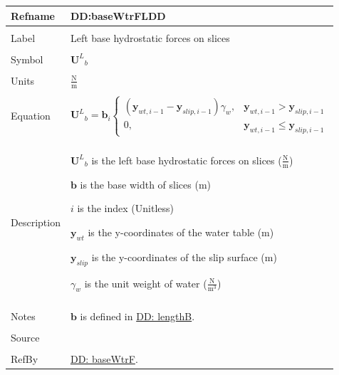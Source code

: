 \documentclass[12pt]{article}
\begin{document}
\noindent \begin{minipage}{\textwidth}
\begin{tabular}{p{} p{}}
\toprule \textbf{Refname} & \textbf{DD:baseWtrFLDD}
\label{DD:baseWtrFLDD}
\\ \midrule \\
Label & Left base hydrostatic forces on slices
\\ \midrule \\
Symbol & ${{\mathbf{U}^{L}}_{b}}$
\\ \midrule \\
Units & $\frac{\text{N}}{\text{m}}$
\\ \midrule \\
Equation & \begin{displaymath}
           {{\mathbf{U}^{L}}_{b}}={\mathbf{b}}_{i} \begin{cases}
\left({\mathbf{y}_{wt,i-1}}-{\mathbf{y}_{slip,i-1}}\right) {γ_{w}}, & {\mathbf{y}_{wt,i-1}}>{\mathbf{y}_{slip,i-1}}\\
0, & {\mathbf{y}_{wt,i-1}}\leq{}{\mathbf{y}_{slip,i-1}}
\end{cases}
           \end{displaymath}
\\ \midrule \\
Description & \begin{symbDescription}
              \item{${{\mathbf{U}^{L}}_{b}}$ is the left base hydrostatic forces on slices ($\frac{\text{N}}{\text{m}}$)}
              \item{$\mathbf{b}$ is the base width of slices (m)}
              \item{$i$ is the index (Unitless)}
              \item{${\mathbf{y}_{wt}}$ is the y-coordinates of the water table (m)}
              \item{${\mathbf{y}_{slip}}$ is the y-coordinates of the slip surface (m)}
              \item{${γ_{w}}$ is the unit weight of water ($\frac{\text{N}}{\text{m}^{3}}$)}
              \end{symbDescription}
\\ \midrule \\
Notes & $\mathbf{b}$ is defined in \hyperref[DD:lengthB]{DD: lengthB}.
\\ \midrule \\
Source & \cite{fredlund1977}
\\ \midrule \\
RefBy & \hyperref[DD:baseWtrF]{DD: baseWtrF}.
\\ \bottomrule \end{tabular}
\end{minipage}
\par~
\end{document}
